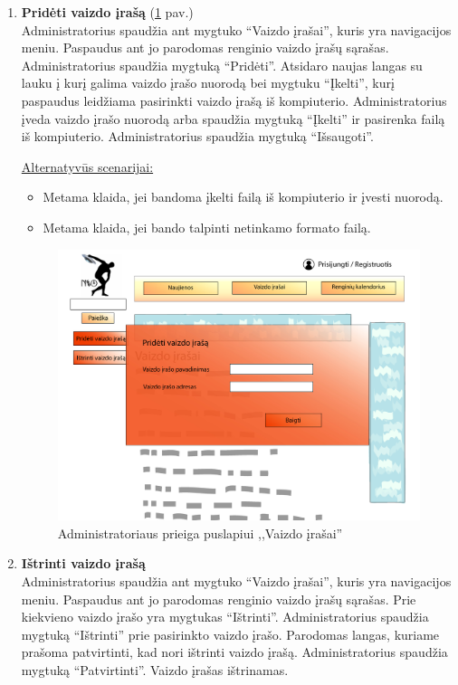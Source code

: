 \documentclass{VUMIFPSkursinis}
\begin{document}
\begin{enumerate} [label = \textbf{U\arabic*.}]
			\item \textbf{Pridėti vaizdo įrašą} (\ref{fig:uzd_admin_vaizdoIrasas} pav.)\\
					Administratorius spaudžia ant mygtuko “Vaizdo įrašai”, kuris yra navigacijos meniu. Paspaudus ant jo parodomas renginio vaizdo įrašų sąrašas. Administratorius spaudžia mygtuką “Pridėti”. Atsidaro naujas langas su lauku į kurį galima vaizdo įrašo nuorodą bei mygtuku “Įkelti”, kurį paspaudus leidžiama pasirinkti vaizdo įrašą iš kompiuterio. Administratorius įveda vaizdo įrašo nuorodą arba spaudžia mygtuką “Įkelti” ir pasirenka failą iš kompiuterio. Administratorius spaudžia mygtuką “Išsaugoti”.
					
					\underline{Alternatyvūs scenarijai:}
					\begin{itemize}
						\item Metama klaida, jei bandoma įkelti failą iš kompiuterio ir įvesti nuorodą.
						\item Metama klaida, jei bando talpinti netinkamo formato failą.
					\end{itemize}
				
				\begin{figure}[H]
					\centering
					\includegraphics[width=\textwidth]{img/PSI4/AdminVaizdoirasai-01.jpg}
					\caption{Administratoriaus prieiga puslapiui ,,Vaizdo įrašai''}
					\label{fig:uzd_admin_vaizdoIrasas}
				\end{figure}
					
			\item \textbf{Ištrinti vaizdo įrašą}   \\
					Administratorius spaudžia ant mygtuko “Vaizdo įrašai”, kuris yra navigacijos meniu. Paspaudus ant jo parodomas renginio vaizdo įrašų sąrašas. Prie kiekvieno vaizdo įrašo yra mygtukas “Ištrinti”. Administratorius spaudžia mygtuką “Ištrinti” prie pasirinkto vaizdo įrašo. Parodomas langas, kuriame prašoma patvirtinti, kad nori ištrinti vaizdo įrašą. Administratorius spaudžia mygtuką “Patvirtinti”. Vaizdo įrašas ištrinamas.
					

\end{enumerate}
\end{document}
